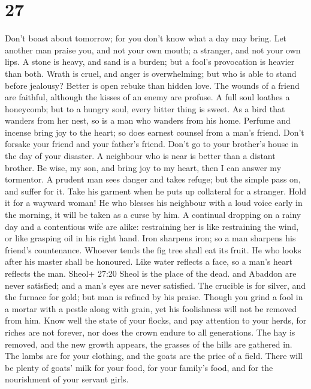 \hypertarget{section-21}{%
\section{27}\label{section-21}}

 Don't boast about tomorrow; for you don't know what a day
may bring.  Let another man praise you, and not your own
mouth; a stranger, and not your own lips.  A stone is heavy,
and sand is a burden; but a fool's provocation is heavier than both.
 Wrath is cruel, and anger is overwhelming; but who is able
to stand before jealousy?  Better is open rebuke than hidden
love.  The wounds of a friend are faithful, although the
kisses of an enemy are profuse.  A full soul loathes a
honeycomb; but to a hungry soul, every bitter thing is sweet.
 As a bird that wanders from her nest, so is a man who
wanders from his home.  Perfume and incense bring joy to the
heart; so does earnest counsel from a man's friend.  Don't
forsake your friend and your father's friend. Don't go to your brother's
house in the day of your disaster. A neighbour who is near is better
than a distant brother.  Be wise, my son, and bring joy to
my heart, then I can answer my tormentor.  A prudent man
sees danger and takes refuge; but the simple pass on, and suffer for it.
 Take his garment when he puts up collateral for a
stranger. Hold it for a wayward woman!  He who blesses his
neighbour with a loud voice early in the morning, it will be taken as a
curse by him.  A continual dropping on a rainy day and a
contentious wife are alike:  restraining her is like
restraining the wind, or like grasping oil in his right hand.
 Iron sharpens iron; so a man sharpens his friend's
countenance.  Whoever tends the fig tree shall eat its
fruit. He who looks after his master shall be honoured. 
Like water reflects a face, so a man's heart reflects the man.
 Sheol+ 27:20 Sheol is the place of the dead. and Abaddon
are never satisfied; and a man's eyes are never satisfied. 
The crucible is for silver, and the furnace for gold; but man is refined
by his praise.  Though you grind a fool in a mortar with a
pestle along with grain, yet his foolishness will not be removed from
him.  Know well the state of your flocks, and pay attention
to your herds,  for riches are not forever, nor does the
crown endure to all generations.  The hay is removed, and
the new growth appears, the grasses of the hills are gathered in.
 The lambs are for your clothing, and the goats are the
price of a field.  There will be plenty of goats' milk for
your food, for your family's food, and for the nourishment of your
servant girls.

